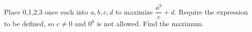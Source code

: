 Place 0,1,2,3 once each into $ a,b,c,d $ to maximize $\dfrac{a^b}{c}+d $. Require the expression to be defined, so $ c\ne0 $ and $ 0^0 $ is not allowed. Find the maximum.
